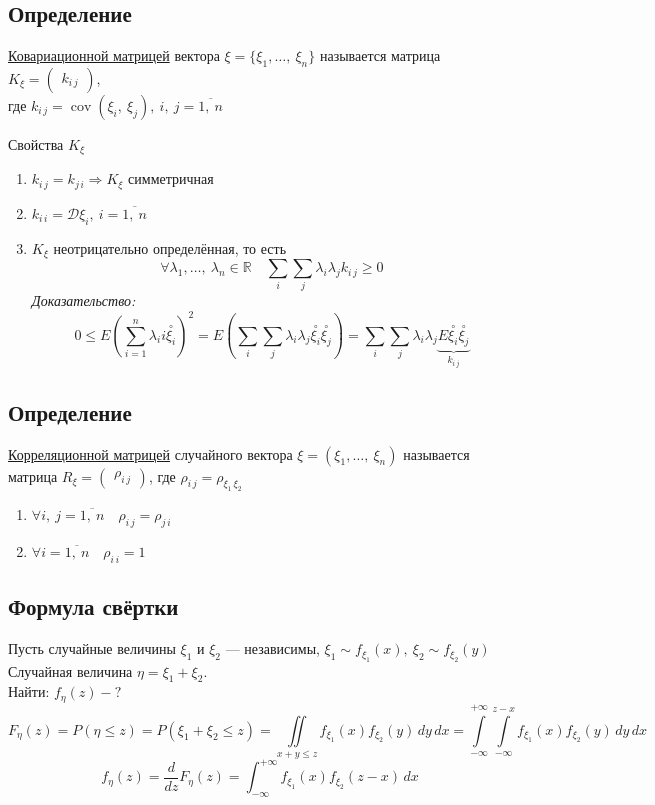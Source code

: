 \documentclass[12pt, a4paper]{article}
\begin{document}
    \subsection*{Определение}
    \underline{Ковариационной матрицей} вектора $\xi = \{\xi_1,\dots,\ \xi_n\}$ называется матрица $K_{\xi} = \begin{pmatrix}
        k_{i\, j}
    \end{pmatrix}$,\\
    где $k_{i\, j} = \operatorname{cov}(\xi_i,\ \xi_j),\ i,\ j = \overline{1,\ n}$
    \begin{center}
        Свойства $K_{\xi}$
    \end{center}
    \begin{enumerate}
        \item $k_{i\, j} = k_{j\, i}\Rightarrow K_{\xi}$ симметричная
        \item $k_{i\, i} = \mathcal{D}\xi_{i},\ i = \overline{1,\ n}$
        \item $K_{\xi}$ неотрицательно определённая, то есть 
        \[\forall \lambda_1,\dots,\ \lambda_n\in\mathbb{R}\quad \sum_i\sum_j \lambda_i\lambda_j k_{i\, j} \geq 0\]
        \textit{Доказательство:}
        \[0 \leq E\left(\sum_{i = 1}^{n} \lambda_ii \overset{\circ}{\xi_i}\right)^2 = E\left( \sum_i \sum_j \lambda_i \lambda_j \overset{\circ}{\xi_i}\overset{\circ}{\xi_j} \right) = \sum_i \sum_j \lambda_i \lambda_j \underset{k_{i\, j}}{\underbrace{E\overset{\circ}{\xi_i}\overset{\circ}{\xi_j}}}\]
    \end{enumerate}
    \subsection*{Определение}
    \underline{Корреляционной матрицей} случайного вектора $\xi = (\xi_1,\dots,\ \xi_n)$ называется матрица $R_{\xi} = \begin{pmatrix}
        \rho_{i\, j}
    \end{pmatrix}$, где $\rho_{i\, j} = \rho_{\xi_1\, \xi_2}$
    \begin{enumerate}
        \item $\forall i,\ j = \overline{1,\ n}\quad \rho_{i\, j} = \rho_{j\, i}$
        \item $\forall i = \overline{1,\ n}\quad \rho_{i\, i} = 1$
    \end{enumerate}
    \subsection*{Формула свёртки}
    Пусть случайные величины $\xi_1$ и $\xi_2$ --- независимы, $\xi_1\sim f_{\xi_1}(x),\ \xi_2 \sim f_{\xi_2}(y)$\\
    Случайная величина $\eta = \xi_1 + \xi_2$.\\
    Найти: $f_{\eta}(z) - ?$
    \[F_{\eta}(z) = P(\eta \leq z) = P(\xi_1 + \xi_2 \leq z) = \iint\limits_{x + y \leq z} f_{\xi_1}(x) f_{\xi_2}(y)\, dy\, dx = \int\limits_{-\infty}^{+\infty}\int\limits_{-\infty}^{z - x} f_{\xi_1}(x) f_{\xi_2}(y)\, dy\, dx\]
    \[f_{\eta}(z) = \frac{d}{dz} F_{\eta}(z) = \int_{-\infty}^{+\infty} f_{\xi_1}(x)f_{\xi_2}(z - x)\, dx\]
\end{document}
